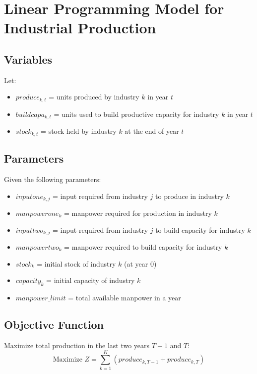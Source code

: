 \documentclass{article}
\begin{document}
\section*{Linear Programming Model for Industrial Production}

\subsection*{Variables}

Let:
\begin{itemize}
    \item $produce_{k,t}$ = units produced by industry $k$ in year $t$
    \item $buildcapa_{k,t}$ = units used to build productive capacity for industry $k$ in year $t$
    \item $stock_{k,t}$ = stock held by industry $k$ at the end of year $t$
\end{itemize}

\subsection*{Parameters}

Given the following parameters:
\begin{itemize}
    \item $inputone_{k,j}$ = input required from industry $j$ to produce in industry $k$
    \item $manpowerone_{k}$ = manpower required for production in industry $k$
    \item $inputtwo_{k,j}$ = input required from industry $j$ to build capacity for industry $k$
    \item $manpowertwo_{k}$ = manpower required to build capacity for industry $k$
    \item $stock_{k}$ = initial stock of industry $k$ (at year 0)
    \item $capacity_{k}$ = initial capacity of industry $k$
    \item $manpower\_limit$ = total available manpower in a year
\end{itemize}

\subsection*{Objective Function}

Maximize total production in the last two years $T-1$ and $T$:
\[
\text{Maximize } Z = \sum_{k=1}^{K} (produce_{k,T-1} + produce_{k,T})
\]
\end{document}
